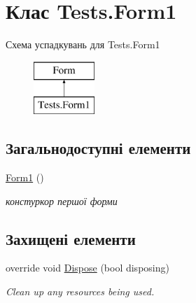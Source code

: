 \hypertarget{class_tests_1_1_form1}{}\section{Клас Tests.\+Form1}
\label{class_tests_1_1_form1}
Схема успадкувань для Tests.\+Form1\begin{figure}[H]
\begin{center}
\leavevmode
\includegraphics[height=2.000000cm]{class_tests_1_1_form1}
\end{center}
\end{figure}
\subsection*{Загальнодоступні елементи}
\begin{DoxyCompactItemize}
\item 
\hyperlink{class_tests_1_1_form1_a9a2a3898ba3628d71cd612c38887b85f}{Form1} ()
\begin{DoxyCompactList}\small\item\em констуркор першої форми \end{DoxyCompactList}\end{DoxyCompactItemize}
\subsection*{Захищені елементи}
\begin{DoxyCompactItemize}
\item 
override void \hyperlink{class_tests_1_1_form1_ad6c795827113080b827ff5bfd3267f38}{Dispose} (bool disposing)
\begin{DoxyCompactList}\small\item\em Clean up any resources being used. \end{DoxyCompactList}\end{DoxyCompactItemize}
